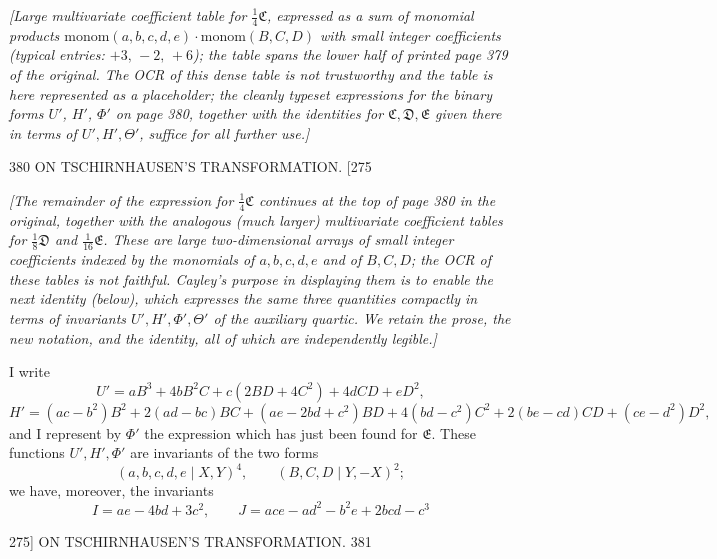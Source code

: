 \documentclass[11pt]{article}
\begin{document}
\medskip
\textit{[Large multivariate coefficient table for $\tfrac{1}{4}\mathfrak{C}$, expressed as a
sum of monomial products $\mathrm{monom}(a,b,c,d,e)\cdot\mathrm{monom}(B,C,D)$ with
small integer coefficients (typical entries: $+3,\,-2,\,+6$); the table spans the lower
half of printed page 379 of the original. The OCR of this dense table is not
trustworthy and the table is here represented as a placeholder; the cleanly typeset
expressions for the binary forms $U'$, $H'$, $\Phi'$ on page 380, together with the
identities for $\mathfrak{C},\mathfrak{D},\mathfrak{E}$ given there in terms of $U',H',\Theta'$,
suffice for all further use.]}

\bigskip

\begin{center}
380 \hfill ON TSCHIRNHAUSEN'S TRANSFORMATION. \hfill \textsc{[275}
\end{center}

\textit{[The remainder of the expression for $\tfrac{1}{4}\mathfrak{C}$ continues at
the top of page 380 in the original, together with the analogous (much larger)
multivariate coefficient tables for $\tfrac{1}{8}\mathfrak{D}$ and $\tfrac{1}{16}\mathfrak{E}$.
These are large two-dimensional arrays of small integer coefficients indexed by the
monomials of $a,b,c,d,e$ and of $B,C,D$; the OCR of these tables is not faithful.
Cayley's purpose in displaying them is to enable the next identity (below), which
expresses the same three quantities compactly in terms of invariants $U',H',\Phi',\Theta'$
of the auxiliary quartic. We retain the prose, the new notation, and the identity,
all of which are independently legible.]}

\bigskip
I write
\[ U'=aB^{3}+4bB^{2}C+c(2BD+4C^{2})+4dCD+eD^{2}, \]
\[ H'=(ac-b^{2})B^{2}+2(ad-bc)BC+(ae-2bd+c^{2})BD
       +4(bd-c^{2})C^{2}+2(be-cd)CD+(ce-d^{2})D^{2}, \]
and I represent by $\Phi'$ the expression which has just been found for $\mathfrak{E}$. These
functions $U',H',\Phi'$ are invariants of the two forms
\[ (a,b,c,d,e \mid X,Y)^{4},\qquad (B,C,D \mid Y,-X)^{2}; \]
we have, moreover, the invariants
\[ I=ae-4bd+3c^{2},\qquad J=ace-ad^{2}-b^{2}e+2bcd-c^{3} \]

\begin{center}
\textsc{275]} \hfill ON TSCHIRNHAUSEN'S TRANSFORMATION. \hfill 381
\end{center}
\end{document}
